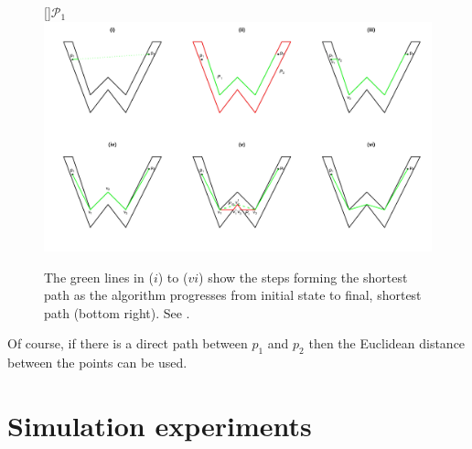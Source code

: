 \begin{figure}
\centering
[]{$\mathcal{P}_1$}
\includegraphics[trim=0in 0.5in 0in 0.25in, width=9.5in]{mds/figs/wdia.pdf} \\
\caption{The green lines in ($i$) to ($vi$) show the steps forming the shortest path as the algorithm progresses from initial state to final, shortest path (bottom right). See .}
\label{wdia}
\end{figure}

Of course, if there is a direct path between $p_1$ and $p_2$ then the Euclidean distance between the points can be used.

\section{Simulation experiments}
\label{mdssims}


